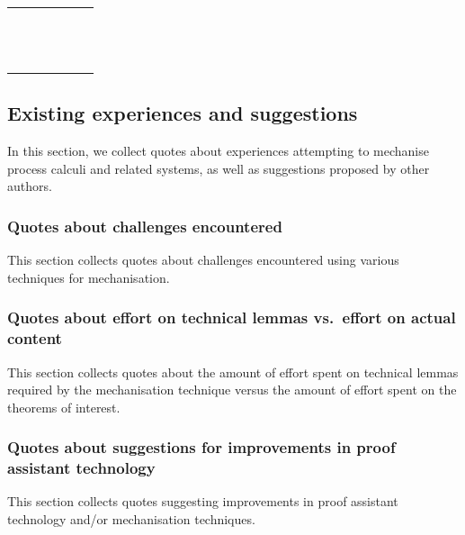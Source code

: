 \begin{tabular}{l|c|c|c|c|l}
  \cite{Hirsch2022} &&&&& \\
  \cite{Cruz-Filipe2021b} &&&&& \\
  \cite{Maksimovic2015} &&&&& \\
  \cite{Parrow2014} &&&&& \\
  \cite{Bengtson2016} &&&&& \\
  \cite{Kahsai2008} &&&&& \\
  \cite{Bengtson2007} &&&&& \\
  \cite{Castro-Perez2021} &&&&& \\
  \cite{Gay2020} &&&&& \\
  \cite{Brady2017} &&&&& \\
  \cite{Hinrichsen2019} &&&&& \\
  \cite{Sergey2017} &&&&&
\end{tabular}

\subsection{Existing experiences and suggestions}
In this section, we collect quotes about experiences attempting to mechanise process calculi and related systems, as well as suggestions proposed by other authors.

\subsubsection{Quotes about challenges encountered}
This section collects quotes about challenges encountered using various techniques for mechanisation.

\subsubsection{Quotes about effort on technical lemmas vs.\ effort on actual content}
This section collects quotes about the amount of effort spent on technical lemmas required by the mechanisation technique versus the amount of effort spent on the theorems of interest.

\subsubsection{Quotes about suggestions for improvements in proof assistant technology}
This section collects quotes suggesting improvements in proof assistant technology and/or mechanisation techniques.

